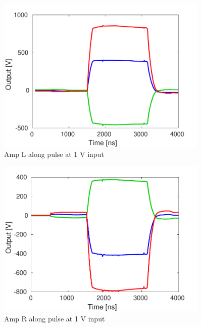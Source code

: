 \begin{figure}
  \centering
  \includegraphics[width=0.9\textwidth]{Figures/commissioning/AmpL_Traces}
  \caption{Amp L along pulse at 1 V input}
  \label{f:ampLTraces}
\end{figure}

\begin{figure}
  \centering
  \includegraphics[width=0.9\textwidth]{Figures/commissioning/AmpR_Traces}
  \caption{Amp R along pulse at 1 V input}
  \label{f:ampRTraces}
\end{figure}

